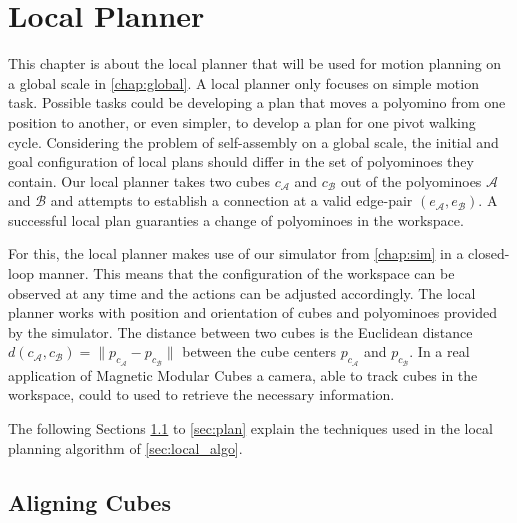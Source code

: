 \chapter{Local Planner}
\label{chap:local}

This chapter is about the local planner that will be used for motion planning on a global scale in \autoref{chap:global}.
A local planner only focuses on simple motion task.
Possible tasks could be developing a plan that moves a polyomino from one position to another, or even simpler, to develop a plan for one pivot walking cycle.
Considering the problem of self-assembly on a global scale, the initial and goal configuration of local plans should differ in the set of polyominoes they contain.
Our local planner takes two cubes $c_\mathcal{A}$ and $c_\mathcal{B}$ out of the polyominoes $\mathcal{A}$ and $\mathcal{B}$ and attempts to establish a connection at a valid edge-pair $(e_\mathcal{A}, e_\mathcal{B})$.
A successful local plan guaranties a change of polyominoes in the workspace.

For this, the local planner makes use of our simulator from \autoref{chap:sim} in a closed-loop manner.
This means that the configuration of the workspace can be observed at any time and the actions can be adjusted accordingly.
The local planner works with position and orientation of cubes and polyominoes provided by the simulator.
The distance between two cubes is the Euclidean distance $d(c_\mathcal{A}, c_\mathcal{B}) = \lVert p_{c_{\mathcal{A}}} - p_{c_{\mathcal{B}}}\rVert$ between the cube centers $p_{c_\mathcal{A}}$ and $p_{c_\mathcal{B}}$.
In a real application of Magnetic Modular Cubes a camera, able to track cubes in the workspace, could to used to retrieve the necessary information. 

The following Sections \ref{sec:align} to \ref{sec:plan} explain the techniques used in the local planning algorithm of \autoref{sec:local_algo}.


\section{Aligning Cubes}
\label{sec:align}

